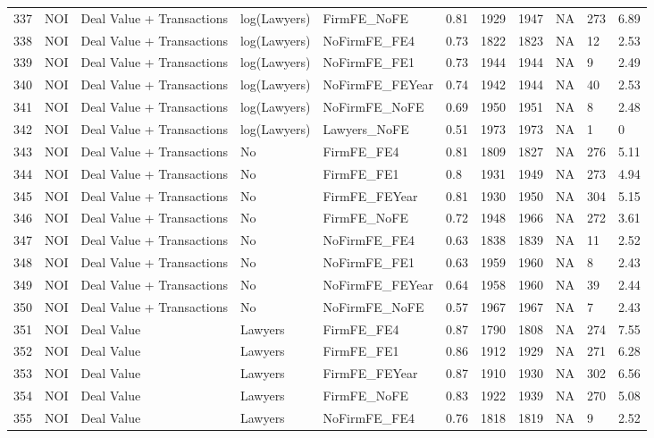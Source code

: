 \documentclass{article}
\begin{document}
\begin{table}[H]
\begin{tabular}{rllllllllll}
  337 & NOI & Deal Value + Transactions & log(Lawyers) & FirmFE\_NoFE & 0.81 & 1929 & 1947 & NA & 273 & 6.89 \\ 
  338 & NOI & Deal Value + Transactions & log(Lawyers) & NoFirmFE\_FE4 & 0.73 & 1822 & 1823 & NA & 12 & 2.53 \\ 
  339 & NOI & Deal Value + Transactions & log(Lawyers) & NoFirmFE\_FE1 & 0.73 & 1944 & 1944 & NA & 9 & 2.49 \\ 
  340 & NOI & Deal Value + Transactions & log(Lawyers) & NoFirmFE\_FEYear & 0.74 & 1942 & 1944 & NA & 40 & 2.53 \\ 
  341 & NOI & Deal Value + Transactions & log(Lawyers) & NoFirmFE\_NoFE & 0.69 & 1950 & 1951 & NA & 8 & 2.48 \\ 
  342 & NOI & Deal Value + Transactions & log(Lawyers) & Lawyers\_NoFE & 0.51 & 1973 & 1973 & NA & 1 & 0 \\ 
  343 & NOI & Deal Value + Transactions & No & FirmFE\_FE4 & 0.81 & 1809 & 1827 & NA & 276 & 5.11 \\ 
  344 & NOI & Deal Value + Transactions & No & FirmFE\_FE1 & 0.8 & 1931 & 1949 & NA & 273 & 4.94 \\ 
  345 & NOI & Deal Value + Transactions & No & FirmFE\_FEYear & 0.81 & 1930 & 1950 & NA & 304 & 5.15 \\ 
  346 & NOI & Deal Value + Transactions & No & FirmFE\_NoFE & 0.72 & 1948 & 1966 & NA & 272 & 3.61 \\ 
  347 & NOI & Deal Value + Transactions & No & NoFirmFE\_FE4 & 0.63 & 1838 & 1839 & NA & 11 & 2.52 \\ 
  348 & NOI & Deal Value + Transactions & No & NoFirmFE\_FE1 & 0.63 & 1959 & 1960 & NA & 8 & 2.43 \\ 
  349 & NOI & Deal Value + Transactions & No & NoFirmFE\_FEYear & 0.64 & 1958 & 1960 & NA & 39 & 2.44 \\ 
  350 & NOI & Deal Value + Transactions & No & NoFirmFE\_NoFE & 0.57 & 1967 & 1967 & NA & 7 & 2.43 \\ 
  351 & NOI & Deal Value & Lawyers & FirmFE\_FE4 & 0.87 & 1790 & 1808 & NA & 274 & 7.55 \\ 
  352 & NOI & Deal Value & Lawyers & FirmFE\_FE1 & 0.86 & 1912 & 1929 & NA & 271 & 6.28 \\ 
  353 & NOI & Deal Value & Lawyers & FirmFE\_FEYear & 0.87 & 1910 & 1930 & NA & 302 & 6.56 \\ 
  354 & NOI & Deal Value & Lawyers & FirmFE\_NoFE & 0.83 & 1922 & 1939 & NA & 270 & 5.08 \\ 
  355 & NOI & Deal Value & Lawyers & NoFirmFE\_FE4 & 0.76 & 1818 & 1819 & NA & 9 & 2.52 \\ 

\end{tabular}
\end{table}
\end{document}
